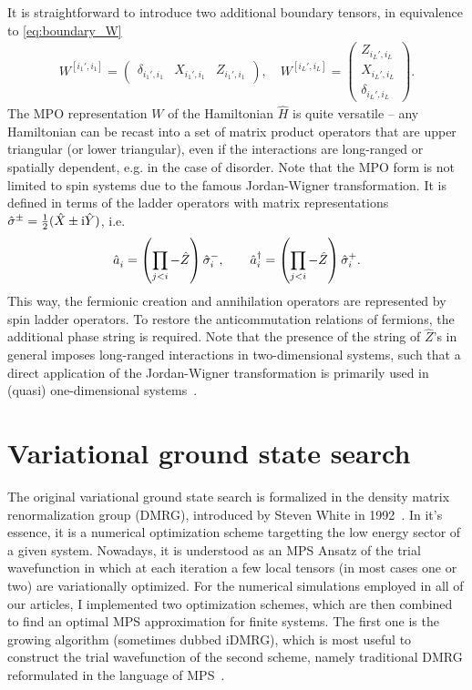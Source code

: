It is straightforward to introduce two additional boundary tensors, in equivalence to \cref{eq:boundary_W}
\begin{align}
    W^{[i_1',i_1]} =
    \begin{pmatrix}
        \delta_{i_1',i_1} & X_{i_1',i_1} & Z_{i_1',i_1}
    \end{pmatrix}
    ,\quad
    W^{[i_L',i_L]} =
    \begin{pmatrix}
         Z_{i_L',i_L} \\
         X_{i_L',i_L} \\
         \delta_{i_L',i_L}
    \end{pmatrix}.
\end{align}
The MPO representation $W$ of the Hamiltonian $\hat H$ is quite versatile -- any Hamiltonian can be recast into a set of matrix product operators that are upper triangular (or lower triangular), even if the interactions are long-ranged or spatially dependent, e.g. in the case of disorder.
Note that the MPO form is not limited to spin systems due to the famous Jordan-Wigner transformation.
It is defined in terms of the ladder operators with matrix representations $\hat\sigma^\pm = \frac12(\hat X\pm\mathrm i \hat Y)$, i.e.
\begin{align}
    \hat a_i^\pdag = \brlr{\prod_{j<i}-\hat Z}\hat\sigma^-_i,
    \qquad
    \hat a_i^\dag = \brlr{\prod_{j<i}-\hat Z}\hat\sigma^+_i.
\end{align}
This way, the fermionic creation and annihilation operators are represented by spin ladder operators.
To restore the anticommutation relations of fermions, the additional phase string is required.
Note that the presence of the string of $\hat Z$'s in general imposes long-ranged interactions in two-dimensional systems, such that a direct application of the Jordan-Wigner transformation is primarily used in (quasi) one-dimensional systems~\cite{Franchini2017}.
%
%
\section{Variational ground state search}
\label{sec:variational_ground_state_search}
%
%
The original variational ground state search is formalized in the density matrix renormalization group (DMRG), introduced by Steven White in 1992~\cite{White1992}.
In it's essence, it is a numerical optimization scheme targetting the low energy sector of a given system.
Nowadays, it is understood as an MPS Ansatz of the trial wavefunction in which at each iteration a few local tensors (in most cases one or two) are variationally optimized.
For the numerical simulations employed in all of our articles, I implemented two optimization schemes, which are then combined to find an optimal MPS approximation for finite systems.
The first one is the growing algorithm (sometimes dubbed iDMRG), which is most useful to construct the trial wavefunction of the second scheme, namely traditional DMRG reformulated in the language of MPS~\cite{Schollwoeck2011,Silvi2019}.

